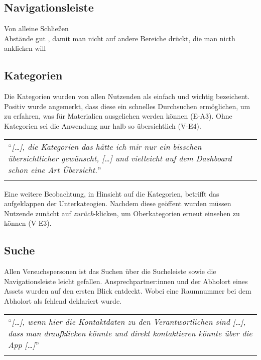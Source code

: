 



\subsection{Navigationsleiste}
Von alleine Schließen\\
Abstände gut , damit man nicht auf andere Bereiche drückt, die man nicth anklicken will


\subsection{Kategorien}
Die Kategorien wurden von allen Nutzenden als einfach und wichtig bezeichent.
Positiv wurde angemerkt, dass diese ein schnelles Durchsuchen ermöglichen, um zu
erfahren, was für Materialien ausgeliehen werden können (E-A3). Ohne Kategorien
sei die Anwendung nur halb so übersichtlich (V-E4).

\begin{longtable}{p{}} \arrayrulecolor{maincolor}\hline
  \enquote{\textit{[\dots], die Kategorien das hätte ich mir nur ein bisschen
      übersichtlicher gewünscht, [\dots] und vielleicht auf dem Dashboard schon eine
  Art Übersicht.}} \\
  \arrayrulecolor{maincolor}\hline
\end{longtable}

Eine weitere Beobachtung, in Hinsicht auf die Kategorien, betrifft das
aufgeklappen der Unterkateogien. Nachdem diese geöffent wurden müssen Nutzende
zunächt auf \textit{zurück}-klicken, um Oberkategorien erneut einsehen zu können
(V-E3).



\subsection{Suche}
Allen Versuchspersonen ist das Suchen über die Sucheleiste sowie die
Navigationsleiste leicht gefallen. Ansprechpartner:innen und der Abholort eines
Assets wurden auf den ersten Blick entdeckt. Wobei eine Raumnummer bei dem
Abholort als fehlend deklariert wurde.

\begin{longtable}{p{}} \arrayrulecolor{maincolor}\hline
  \enquote{\textit{[\dots], wenn hier die Kontaktdaten zu den Verantwortlichen
      sind [\dots], dass man draufklicken könnte und direkt kontaktieren könnte
  über die App [\dots]}} \\
  \arrayrulecolor{maincolor}\hline
\end{longtable}


